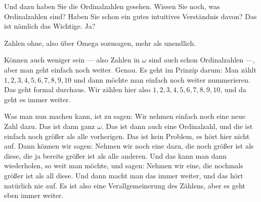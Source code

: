 \begin{spoken-clean}[00:05:30 - 00:05:45]
Und dazu haben Sie die Ordinalzahlen gesehen. Wissen Sie noch, was Ordinalzahlen sind? Haben Sie schon ein gutes intuitives Verständnis davon? Das ist nämlich das Wichtige. Ja?
\end{spoken-clean}

\begin{student-interaction}[Studentenantwort]
Zahlen ohne, also über Omega sozusagen, mehr als unendlich.
\end{student-interaction}

\begin{spoken-clean}[00:05:50 - 00:07:15]
Können auch weniger sein --- also Zahlen in $\omega$ sind auch schon Ordinalzahlen ---, aber man geht einfach noch weiter. Genau. Es geht im Prinzip darum: Man zählt $1, 2, 3, 4, 5, 6, 7, 8, 9, 10$ und dann möchte man einfach noch weiter nummerieren. Das geht formal durchaus. Wir zählen hier also $1, 2, 3, 4, 5, 6, 7, 8, 9, 10$, und da geht es immer weiter.

Was man nun machen kann, ist zu sagen: Wir nehmen einfach noch eine neue Zahl dazu. Das ist dann ganz $\omega$. Das ist dann auch eine Ordinalzahl, und die ist einfach noch größer als alle vorherigen. Das ist kein Problem, es hört hier nicht auf. Dann können wir sagen: Nehmen wir noch eine dazu, die noch größer ist als diese, die ja bereits größer ist als alle anderen. Und das kann man dann wiederholen, so weit man möchte, und sagen: Nehmen wir eine, die nochmals größer ist als all diese. Und dann macht man das immer weiter, und das hört natürlich nie auf. Es ist also eine Verallgemeinerung des Zählens, aber es geht eben immer weiter.
\end{spoken-clean}

